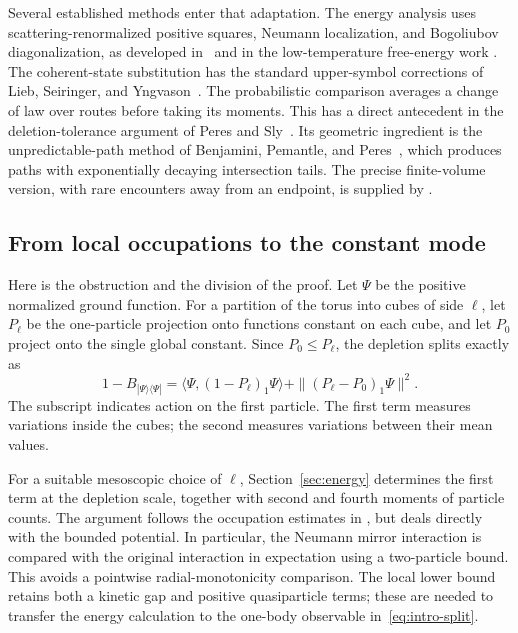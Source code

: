 Several established methods enter that adaptation. The energy analysis
uses scattering-renormalized positive squares, Neumann localization,
and Bogoliubov diagonalization, as developed in~\cite{FS2020,FS2023}
and in the low-temperature free-energy work
\cite{HHNST,FJGMOTr}. The coherent-state substitution has the standard
upper-symbol corrections of Lieb, Seiringer, and
Yngvason~\cite{LSY2005}. The probabilistic comparison averages a change
of law over routes before taking its moments. This has a direct
antecedent in the deletion-tolerance argument of Peres and
Sly~\cite[Proposition~2.1]{PeresSly}. Its geometric ingredient is the
unpredictable-path method of Benjamini, Pemantle, and
Peres~\cite{BPP}, which produces paths with exponentially decaying
intersection tails. The precise finite-volume version, with rare
encounters away from an endpoint, is supplied by
\cite[Proposition~7.1]{D}.

\subsection{From local occupations to the constant mode}

Here is the obstruction and the division of the proof. Let $\Psi$ be
the positive normalized ground function. For a partition of the torus
into cubes of side $\ell$, let $P_\ell$ be the one-particle projection
onto functions constant on each cube, and let $P_0$ project onto the
single global constant. Since $P_0\le P_\ell$, the depletion splits
exactly as
\begin{equation}\label{eq:intro-split}
 1-B_{|\Psi\rangle\langle\Psi|}
 =\langle\Psi,(1-P_\ell)_1\Psi\rangle
                    +\|(P_\ell-P_0)_1\Psi\|^2.
\end{equation}
The subscript indicates action on the first particle. The first term
measures variations inside the cubes; the second measures variations
between their mean values.

For a suitable mesoscopic choice of $\ell$, Section~\ref{sec:energy}
determines the first term at the depletion scale, together with second
and fourth moments of particle counts.
The argument follows the occupation estimates in
\cite[Section~3]{D}, but deals directly with the bounded potential.
In particular, the Neumann mirror interaction is compared with the
original interaction in expectation using a two-particle bound. This
avoids a pointwise radial-monotonicity comparison. The local lower
bound retains both a kinetic gap and positive quasiparticle terms;
these are needed to transfer the energy calculation to the one-body
observable in~\eqref{eq:intro-split}.


